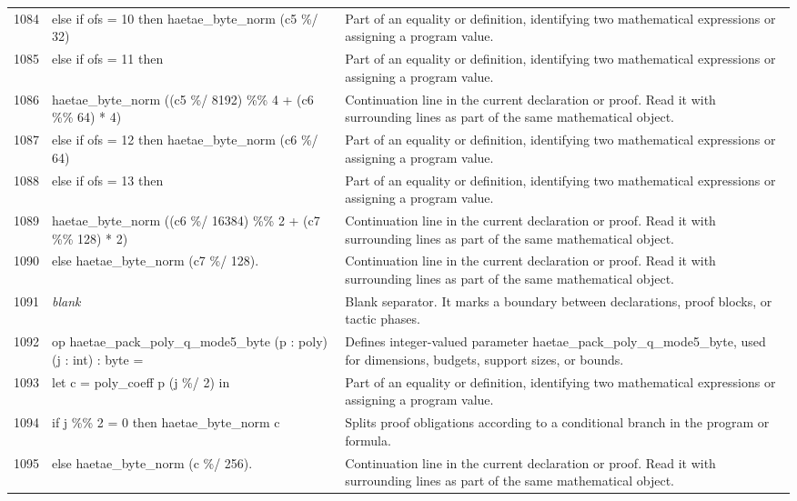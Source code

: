 \documentclass[10pt]{article}
\begin{document}
\begin{longtable}{r L{0.53\textwidth} L{0.37\textwidth}}
1084 & {\ttfamily\scriptsize   else if ofs = 10 then haetae\_byte\_norm (c5 \%/ 32)} & Part of an equality or definition, identifying two mathematical expressions or assigning a program value. \\
1085 & {\ttfamily\scriptsize   else if ofs = 11 then} & Part of an equality or definition, identifying two mathematical expressions or assigning a program value. \\
1086 & {\ttfamily\scriptsize     haetae\_byte\_norm ((c5 \%/ 8192) \%\% 4 + (c6 \%\% 64) * 4)} & Continuation line in the current declaration or proof.  Read it with surrounding lines as part of the same mathematical object. \\
1087 & {\ttfamily\scriptsize   else if ofs = 12 then haetae\_byte\_norm (c6 \%/ 64)} & Part of an equality or definition, identifying two mathematical expressions or assigning a program value. \\
1088 & {\ttfamily\scriptsize   else if ofs = 13 then} & Part of an equality or definition, identifying two mathematical expressions or assigning a program value. \\
1089 & {\ttfamily\scriptsize     haetae\_byte\_norm ((c6 \%/ 16384) \%\% 2 + (c7 \%\% 128) * 2)} & Continuation line in the current declaration or proof.  Read it with surrounding lines as part of the same mathematical object. \\
1090 & {\ttfamily\scriptsize   else haetae\_byte\_norm (c7 \%/ 128).} & Continuation line in the current declaration or proof.  Read it with surrounding lines as part of the same mathematical object. \\
1091 & {\ttfamily\scriptsize \emph{blank}} & Blank separator.  It marks a boundary between declarations, proof blocks, or tactic phases. \\
1092 & {\ttfamily\scriptsize op haetae\_pack\_poly\_q\_mode5\_byte (p : poly) (j : int) : byte =} & Defines integer-valued parameter haetae\_pack\_poly\_q\_mode5\_byte, used for dimensions, budgets, support sizes, or bounds. \\
1093 & {\ttfamily\scriptsize   let c = poly\_coeff p (j \%/ 2) in} & Part of an equality or definition, identifying two mathematical expressions or assigning a program value. \\
1094 & {\ttfamily\scriptsize   if j \%\% 2 = 0 then haetae\_byte\_norm c} & Splits proof obligations according to a conditional branch in the program or formula. \\
1095 & {\ttfamily\scriptsize   else haetae\_byte\_norm (c \%/ 256).} & Continuation line in the current declaration or proof.  Read it with surrounding lines as part of the same mathematical object. \\

\end{longtable}
\end{document}
